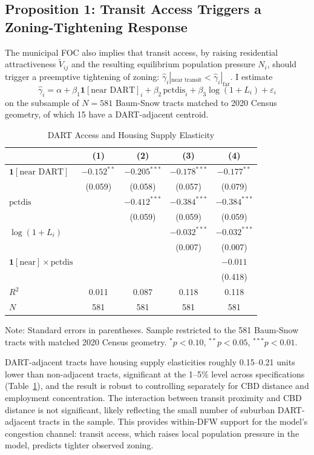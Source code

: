\documentclass[12pt, a4paper]{article}
\theoremstyle{definition}
\begin{document}
\subsection{Proposition 1: Transit Access Triggers a Zoning-Tightening Response}

The municipal FOC also implies that transit access, by raising residential attractiveness $\tilde V_{ij}$ and the resulting equilibrium population pressure $N_i$, should trigger a preemptive tightening of zoning: $\hat\gamma_i|_{\text{near transit}} < \hat\gamma_i|_{\text{far}}$. I estimate
\[
\hat\gamma_i = \alpha + \beta_1 \mathbf{1}[\text{near DART}]_i + \beta_2\,\text{pctdis}_i + \beta_3 \log(1+L_i) + \varepsilon_i
\]
on the subsample of $N=581$ Baum-Snow tracts matched to 2020 Census geometry, of which 15 have a DART-adjacent centroid.

\begin{table}[htbp]
\centering
\caption{DART Access and Housing Supply Elasticity}
\label{tab:p2}
\begin{tabular}{lcccc}
\toprule
& (1) & (2) & (3) & (4) \\
\midrule
$\mathbf{1}[\text{near DART}]$ & $-0.152^{**}$ & $-0.205^{***}$ & $-0.178^{***}$ & $-0.177^{**}$ \\
 & (0.059) & (0.058) & (0.057) & (0.079) \\
$\text{pctdis}$ & & $-0.412^{***}$ & $-0.384^{***}$ & $-0.384^{***}$ \\
 & & (0.059) & (0.059) & (0.059) \\
$\log(1+L_i)$ & & & $-0.032^{***}$ & $-0.032^{***}$ \\
 & & & (0.007) & (0.007) \\
$\mathbf{1}[\text{near}]\times\text{pctdis}$ & & & & $-0.011$ \\
 & & & & (0.418) \\
\midrule
$R^2$ & 0.011 & 0.087 & 0.118 & 0.118 \\
$N$ & 581 & 581 & 581 & 581 \\
\bottomrule
\end{tabular}
\begin{minipage}{0.9\textwidth}
\footnotesize Note: Standard errors in parentheses. Sample restricted to the 581 Baum-Snow tracts with matched 2020 Census geometry. $^{*}p<0.10$, $^{**}p<0.05$, $^{***}p<0.01$.
\end{minipage}
\end{table}

DART-adjacent tracts have housing supply elasticities roughly 0.15--0.21 units lower than non-adjacent tracts, significant at the 1--5\% level across specifications (Table~\ref{tab:p2}), and the result is robust to controlling separately for CBD distance and employment concentration. The interaction between transit proximity and CBD distance is not significant, likely reflecting the small number of suburban DART-adjacent tracts in the sample. This provides within-DFW support for the model's congestion channel: transit access, which raises local population pressure in the model, predicts tighter observed zoning.
\end{document}

